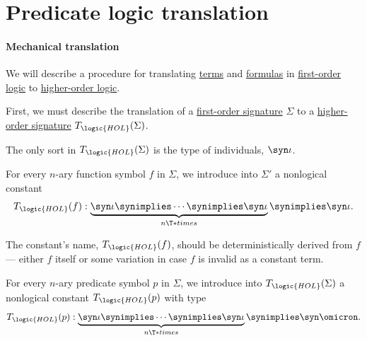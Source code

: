 \section{Predicate logic translation}\label{sec:predicate_logic_translation}

\paragraph{Mechanical translation}

\begin{algorithm}\label{alg:fol_to_hol}
  We will describe a procedure for translating \hyperref[def:fol_term]{terms} and \hyperref[def:fol_formula]{formulas} in \hyperref[def:first_order_logic]{first-order logic} to \hyperref[def:higher_order_logic]{higher-order logic}.

  \begin{thmenum}
     First, we must describe the translation of a \hyperref[def:fol_signature]{first-order signature} \( \Sigma \) to a \hyperref[def:hol_signature]{higher-order signature} \( T_{\logic{HOL}}(\Sigma) \).
    \begin{thmenum}
       The only sort in \( T_{\logic{HOL}}(\Sigma) \) is the type of individuals, \( \syn\iota \).

       For every \( n \)-ary function symbol \( f \) in \( \Sigma \), we introduce into \( \Sigma' \) a nonlogical constant
      \begin{equation*}
        T_{\logic{HOL}}(f): \underbrace{\syn\iota \synimplies \cdots \synimplies \syn\iota}_{n \T*{times}} \synimplies \syn\iota.
      \end{equation*}

      The constant's name, \( T_{\logic{HOL}}(f) \), should be deterministically derived from \( f \) --- either \( f \) itself or some variation in case \( f \) is invalid as a constant term.

       For every \( n \)-ary predicate symbol \( p \) in \( \Sigma \), we introduce into \( T_{\logic{HOL}}(\Sigma) \) a nonlogical constant \( T_{\logic{HOL}}(p) \) with type
      \begin{equation*}
        T_{\logic{HOL}}(p): \underbrace{\syn\iota \synimplies \cdots \synimplies \syn\iota}_{n \T*{times}} \synimplies \syn\omicron.
      \end{equation*}
    \end{thmenum}


\end{thmenum}
\end{algorithm}
